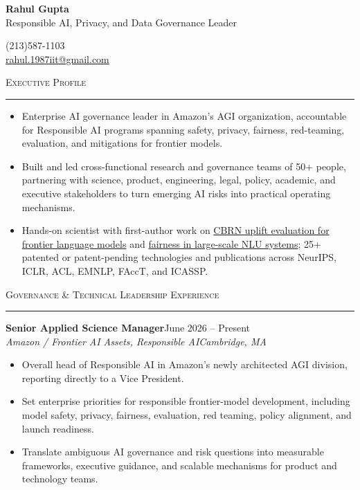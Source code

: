 \documentclass[11pt]{article}
\newcommand{\sectionheading}[1]{%
  \vspace{8pt}%
  {\large\scshape #1}\par\vspace{1pt}\hrule\vspace{3pt}%
}
\newcommand{\resumeentry}[5]{%
  \textbf{#1}\hfill #2\\
  \textit{#3}\hfill \textit{#4}
  \begin{itemize}
    #5
  \end{itemize}
  \vspace{2pt}
}
\newcommand{\socialicons}{%
  \href{https://www.linkedin.com/in/rahul-gupta-16139818}{\textcolor[HTML]{0077B5}{\Large\faLinkedin}}%
  \hspace{0.55em}%
  \href{https://scholar.google.com/citations?user=gSTLsFcAAAAJ}{\textcolor[HTML]{4285F4}{\Large\aiGoogleScholarSquare}}%
}
\begin{document}
\begin{center}
  {\LARGE\bfseries Rahul Gupta}\\[4pt]
  {\large Responsible AI, Privacy, and Data Governance Leader}
\end{center}

\vspace{10pt}

\begin{minipage}[t]{0.48\textwidth}
  (213)587-1103\\
  \href{mailto:rahul.1987iit@gmail.com}{rahul.1987iit@gmail.com}
\end{minipage}
\hfill
\begin{minipage}[t]{0.48\textwidth}
  \raggedleft
  \socialicons
\end{minipage}

\sectionheading{Executive Profile}
\begin{itemize}
  \item Enterprise AI governance leader in Amazon's AGI organization, accountable for Responsible AI programs spanning safety, privacy, fairness, red-teaming, evaluation, and mitigations for frontier models.
  \item Built and led cross-functional research and governance teams of 50+ people, partnering with science, product, engineering, legal, policy, academic, and executive stakeholders to turn emerging AI risks into practical operating mechanisms.
  \item Hands-on scientist with first-author work on \href{https://arxiv.org/abs/2607.12200}{CBRN uplift evaluation for frontier language models} and \href{https://dl.acm.org/doi/abs/10.1145/3539597.3575785}{fairness in large-scale NLU systems}; 25+ patented or patent-pending technologies and publications across NeurIPS, ICLR, ACL, EMNLP, FAccT, and ICASSP.
\end{itemize}

\sectionheading{Governance \& Technical Leadership Experience}

\resumeentry
  {Senior Applied Science Manager}
  {June 2026 -- Present}
  {Amazon / Frontier AI Assets, Responsible AI}
  {Cambridge, MA}
  {\item Overall head of Responsible AI in Amazon's newly architected AGI division, reporting directly to a Vice President.
   \item Set enterprise priorities for responsible frontier-model development, including model safety, privacy, fairness, evaluation, red teaming, policy alignment, and launch readiness.
   \item Translate ambiguous AI governance and risk questions into measurable frameworks, executive guidance, and scalable mechanisms for product and technology teams.}
\end{document}
